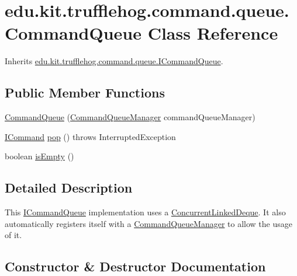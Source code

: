 \hypertarget{classedu_1_1kit_1_1trufflehog_1_1command_1_1queue_1_1_command_queue}{}\section{edu.\+kit.\+trufflehog.\+command.\+queue.\+Command\+Queue Class Reference}
\label{classedu_1_1kit_1_1trufflehog_1_1command_1_1queue_1_1_command_queue}


Inherits \hyperlink{interfaceedu_1_1kit_1_1trufflehog_1_1command_1_1queue_1_1_i_command_queue}{edu.\+kit.\+trufflehog.\+command.\+queue.\+I\+Command\+Queue}.

\subsection*{Public Member Functions}
\begin{DoxyCompactItemize}
\item 
\hyperlink{classedu_1_1kit_1_1trufflehog_1_1command_1_1queue_1_1_command_queue_a44d6c27e66df00b8eaf645bba1247e11}{Command\+Queue} (\hyperlink{classedu_1_1kit_1_1trufflehog_1_1command_1_1queue_1_1_command_queue_manager}{Command\+Queue\+Manager} command\+Queue\+Manager)
\item 
\hyperlink{interfaceedu_1_1kit_1_1trufflehog_1_1command_1_1_i_command}{I\+Command} \hyperlink{classedu_1_1kit_1_1trufflehog_1_1command_1_1queue_1_1_command_queue_a4b7286000646adfdf52a9006ab944acb}{pop} ()  throws Interrupted\+Exception 
\item 
boolean \hyperlink{classedu_1_1kit_1_1trufflehog_1_1command_1_1queue_1_1_command_queue_aaec2b8be8558dad0971f55bab6d1017d}{is\+Empty} ()
\end{DoxyCompactItemize}


\subsection{Detailed Description}
This \hyperlink{interfaceedu_1_1kit_1_1trufflehog_1_1command_1_1queue_1_1_i_command_queue}{I\+Command\+Queue} implementation uses a \hyperlink{}{Concurrent\+Linked\+Deque}. It also automatically registers itself with a \hyperlink{classedu_1_1kit_1_1trufflehog_1_1command_1_1queue_1_1_command_queue_manager}{Command\+Queue\+Manager} to allow the usage of it. 

\subsection{Constructor \& Destructor Documentation}
\hypertarget{classedu_1_1kit_1_1trufflehog_1_1command_1_1queue_1_1_command_queue_a44d6c27e66df00b8eaf645bba1247e11}{}
